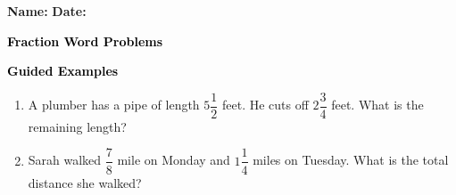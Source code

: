 \documentclass[12pt, letterpaper, fleqn]{article}
\begin{document}
\textbf{Name:} \underline{\hspace{5cm}}
\hfill
\textbf{Date:} \underline{\hspace{3cm}}\\

\begin{tcolorbox}[colback=customteal!20]
    \large\textcolor{black}{\textbf{Fraction Word Problems}}
\end{tcolorbox}
\newpage
\begin{tcolorbox}[colback=customteal!20]
    \large\textcolor{black}{\textbf{Guided Examples}}
\end{tcolorbox}
\begin{enumerate}[itemsep=3.5cm, leftmargin=0.6cm]
\item A plumber has a pipe of length $5\dfrac{1}{2}$ feet. He cuts off $2\dfrac{3}{4}$ feet. What is the remaining length?
\vspace{3cm}
\item Sarah walked $\dfrac{7}{8}$ mile on Monday and $1\dfrac{1}{4}$ miles on Tuesday. What is the total distance she walked?
\end{enumerate}
\end{document}
